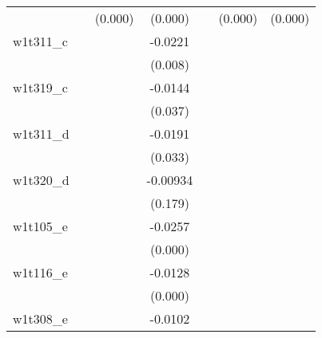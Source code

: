 {\begin{tabular}{l*{6}{c}}
            &                     &     (0.000)         &     (0.000)         &                     &     (0.000)         &     (0.000)         \\
[1em]
w1t311\_c    &                     &                     &     -0.0221\sym{***}&                     &                     &                     \\
            &                     &                     &     (0.008)         &                     &                     &                     \\
[1em]
w1t319\_c    &                     &                     &     -0.0144\sym{**} &                     &                     &                     \\
            &                     &                     &     (0.037)         &                     &                     &                     \\
[1em]
w1t311\_d    &                     &                     &     -0.0191\sym{**} &                     &                     &                     \\
            &                     &                     &     (0.033)         &                     &                     &                     \\
[1em]
w1t320\_d    &                     &                     &    -0.00934         &                     &                     &                     \\
            &                     &                     &     (0.179)         &                     &                     &                     \\
[1em]
w1t105\_e    &                     &                     &     -0.0257\sym{***}&                     &                     &                     \\
            &                     &                     &     (0.000)         &                     &                     &                     \\
[1em]
w1t116\_e    &                     &                     &     -0.0128\sym{***}&                     &                     &                     \\
            &                     &                     &     (0.000)         &                     &                     &                     \\
[1em]
w1t308\_e    &                     &                     &     -0.0102         &                     &                     &                     \\

\end{tabular}}
